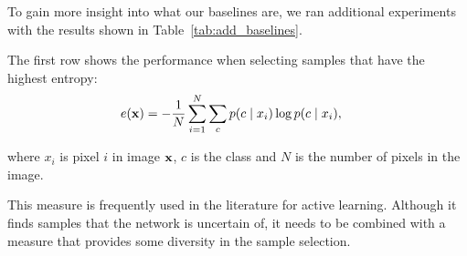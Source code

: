 \documentclass[letterpaper, 10 pt, conference]{ieeeconf}  %
\begin{document}
   
%
   




To gain more insight into what our baselines are, we ran additional experiments with the results shown in Table~\ref{tab:add_baselines}. 

The first row shows the performance when selecting samples that have the highest entropy:
\begin{align}
e(\bold{x}) &= -\frac{1}{N} \sum_{i=1}^N \sum_{c} p(c \mid x_i) \log p(c \mid x_i),
\end{align}  

where $x_i$ is pixel $i$ in image $\bold{x}$, $c$ is the class and $N$ is the number of pixels in the image.

This measure is frequently used in the literature \cite{chakraborty2015active, zhou2017fine} for active learning. Although it finds samples that the network is uncertain of, it needs to be combined with a measure that provides some diversity in the sample selection. 
\end{document}
